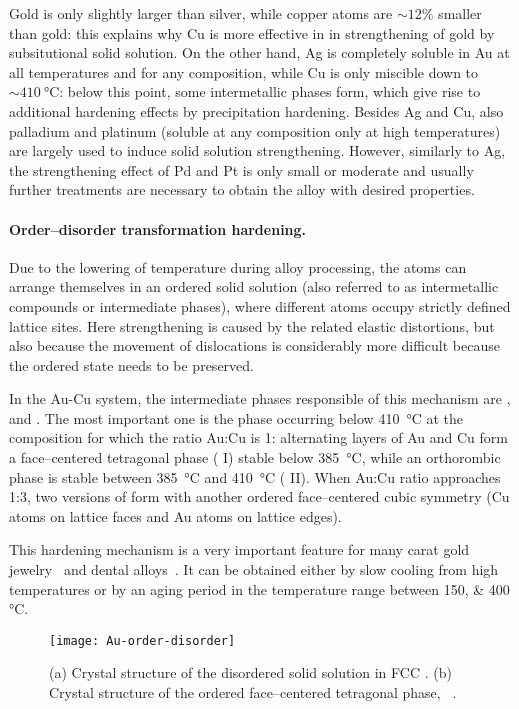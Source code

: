 Gold is only slightly larger than silver, while copper atoms are $\sim 12\%$ smaller than gold: this explains why Cu is more effective in in strengthening of gold by subsitutional solid solution. On the other hand, Ag is completely soluble in Au at all temperatures and for any composition, while Cu is only miscible down to $\sim\SI{410}{\celsius}$: below this point, some intermetallic phases form, which give rise to additional hardening effects by precipitation hardening. Besides Ag and Cu, also palladium and platinum (soluble at any composition only at high temperatures) are largely used to induce solid solution strengthening. However, similarly to Ag, the strengthening effect of Pd and Pt is only small or moderate and usually further treatments are necessary to obtain the alloy with desired properties.
    




\paragraph{Order--disorder transformation hardening.} Due to the lowering of temperature during alloy processing, the atoms can arrange themselves in an ordered solid solution (also referred to as intermetallic compounds or intermediate phases), where different atoms occupy strictly defined lattice sites. Here strengthening is caused by the related elastic distortions, but also because the movement of dislocations is considerably more difficult because the ordered state needs to be preserved.

In the Au-Cu system, the intermediate phases responsible of this mechanism are ,  and .
The most important one is the phase occurring below \SI{410}{\celsius} at the composition for which the ratio Au:Cu is 1: alternating layers of Au and Cu form a face--centered tetragonal phase ( I) stable below \SI{385}{\celsius}, while an orthorombic phase is stable between \SI{385}{\celsius} and \SI{410}{\celsius} ( II). When Au:Cu ratio approaches 1:3, two versions of  form with another ordered face--centered cubic symmetry (Cu atoms on lattice faces and Au atoms on lattice edges).

This hardening mechanism is a very important feature for many carat gold jewelry~\cite{Chaston1971:31GoldBook} and dental alloys~\cite{Laberge1979:35GoldBook}. It can be obtained either by slow cooling from high temperatures or by an aging period in the temperature range between \numlist{150;400} \si{\celsius}.
\begin{figure}[t]
    \centering
    \texttt{[image: Au-order-disorder]}
    \caption{(a) Crystal structure of the disordered solid solution in FCC . (b) Crystal structure of the ordered face--centered tetragonal phase, ~\cite{Suss2004}.}
    \label{fig:order-disorder}
\end{figure}






